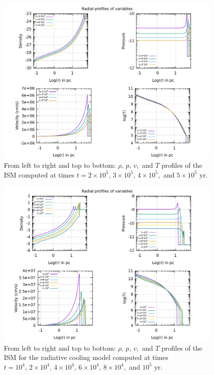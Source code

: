 \documentclass{article}
\begin{document}
\begin{figure}[H]
	\centering
	\includegraphics[width=1 \linewidth]{radialprofileshight.pdf}
	\caption{From left to right and top to bottom: $\rho,\,p,\,v,$ and $T$ profiles of the ISM computed at times $t=2\times10^5,\,3\times10^5,\,4\times10^5,$ and $5\times10^5$ yr.}

	\label{fig:radialprhight}
\end{figure}
\begin{figure}[H]
	\centering
	\includegraphics[width=1 \linewidth]{radialprofilescool.pdf}
	\caption{From left to right and top to bottom: $\rho,\,p,\,v,$ and $T$ profiles of the ISM for the radiative cooling model computed at times $t=10^4,\,2\times10^4,\,4\times10^4,\,6\times10^4,\,8\times 10^4,$ and $10^5$ yr.}

	\label{fig:radialprcool}
\end{figure}
\end{document}
